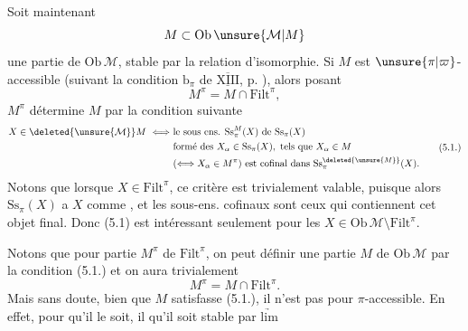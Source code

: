
Soit maintenant
\[
 M\subset\mathrm{Ob}\,\unsure{\mathcal M|M}
\]
une partie de $\mathrm{Ob}\,\mathcal M$, stable par la relation d'isomorphie. Si $M$ est $\unsure{\pi|\varpi}$-accessible  (suivant la
condition $\mathrm b_\pi$ de $\overline{\underline{\mathrm{XIII}}}$, p. ), alors 
posant
\[
 M^\pi=M\cap\mathrm{Filt}^\pi,
\]
$M^\pi$ détermine $M$ par la condition suivante
\[
\begin{aligned}
 X\in \deleted{\unsure{\mathcal M}}M\ \Longleftrightarrow\ &\text{le sous ens. }\mathrm{Ss}^M_\pi(X)\text{ de }\mathrm{Ss}_\pi(X)\\
 &\text{formé des }X_\alpha\in\mathrm{Ss}_\pi(X),\text{ tels que }X_\alpha\in M\\
 &(\Longleftrightarrow X_\alpha\in M^\pi)\text{ est cofinal dans }\mathrm{Ss}^{\deleted{\unsure{M}}}_\pi(X).
\end{aligned}\tag*{(5.1.)}
\]
Notons que lorsque $X\in\mathrm{Filt}^\pi$, ce critère est
trivialement valable, puisque alors $\mathrm{Ss}_\pi(X)$ a
$X$ comme  , et les sous-ens.
cofinaux sont ceux qui contiennent
cet objet final. Donc (5.1) est intéressant
seulement pour les $X\in\mathrm{Ob}\,\mathcal M\setminus\mathrm{Filt}^\pi$.

Notons que pour \uline{} partie $M^\pi$ de
$\mathrm{Filt}^\pi$, on peut définir une partie $M$
de $\mathrm{Ob}\,\mathcal M$ par la condition (5.1.) et on
aura trivialement
\[
 M^\pi=M\cap\mathrm{Filt}^\pi.\tag*{(5.2.)}
\]
Mais sans doute, bien que $M$ satisfasse
(5.1.), il n'est pas pour  
$\pi$-accessible. En effet, pour qu'il le
soit, il  qu'il soit stable par $\underrightarrow{\mathrm{lim}}$

